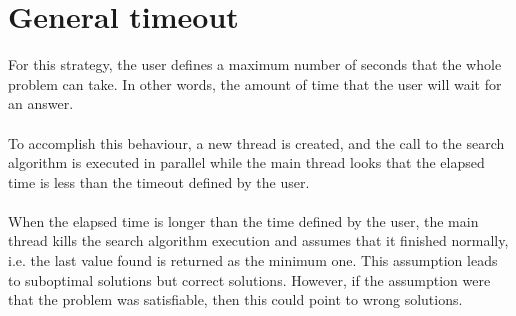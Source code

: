 \section{General timeout}
For this strategy, the user defines a maximum number of seconds that the whole problem can take. In other words, the amount of time that the user will wait for an answer. \\\\
To accomplish this behaviour, a new thread is created, and the call to the search algorithm is executed in parallel while the main thread looks that the elapsed time is less than the timeout defined by the user.  \\\\
When the elapsed time is longer than the time defined by the user, the main thread kills the search algorithm execution and assumes that it finished normally, i.e. the last value found is returned as the minimum one. This assumption leads to suboptimal solutions but correct solutions. However, if the assumption were that the problem was satisfiable, then this could point to wrong solutions. 
